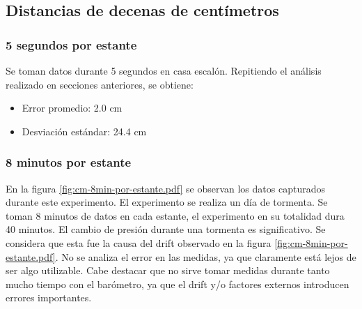 \documentclass[main]{subfiles}
\begin{document}
\subsection{Distancias de decenas de centímetros}

\subsubsection{5 segundos por estante}

Se toman datos durante 5 segundos en casa escalón. Repitiendo el análisis realizado en secciones anteriores, se obtiene:
\begin{itemize}
\item Error promedio: 2.0 cm
\item Desviación estándar: 24.4 cm
\end{itemize}

\subsubsection{8 minutos por estante}

\begin{figure}
\vspace{-90pt}
\centering
{}
\vspace{-10pt}
\caption{}
\vspace{-10pt}
\end{figure}

En la figura \ref{fig:cm-8min-por-estante.pdf} se observan los datos capturados durante este experimento. El experimento se realiza un día de tormenta. Se toman 8 minutos de datos en cada estante, el experimento en su totalidad dura 40 minutos. El cambio de presión durante una tormenta es significativo. Se considera que esta fue la causa del drift observado en la figura \ref{fig:cm-8min-por-estante.pdf}. No se analiza el error en las medidas, ya que claramente está lejos de ser algo utilizable. Cabe destacar que no sirve tomar medidas durante tanto mucho tiempo con el barómetro, ya que el drift y/o factores externos introducen errores importantes.
\end{document}

